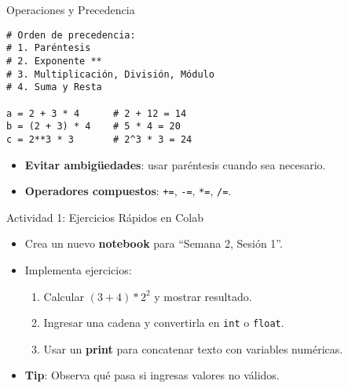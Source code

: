 \documentclass[10pt]{beamer}
\begin{document}
\begin{frame}[fragile]{Operaciones y Precedencia}
\begin{verbatim}
# Orden de precedencia:
# 1. Paréntesis
# 2. Exponente **
# 3. Multiplicación, División, Módulo
# 4. Suma y Resta

a = 2 + 3 * 4      # 2 + 12 = 14
b = (2 + 3) * 4    # 5 * 4 = 20
c = 2**3 * 3       # 2^3 * 3 = 24
\end{verbatim}
\begin{itemize}
  \item \textbf{Evitar ambigüedades}: usar paréntesis cuando sea necesario.
  \item \textbf{Operadores compuestos}: \texttt{+=}, \texttt{-=}, \texttt{*=}, \texttt{/=}.
\end{itemize}
\end{frame}

\begin{frame}{Actividad 1: Ejercicios Rápidos en Colab}
  \begin{itemize}
    \item Crea un nuevo \textbf{notebook} para “Semana 2, Sesión 1”.
    \item Implementa ejercicios:
      \begin{enumerate}
        \item Calcular \((3+4) * 2^2\) y mostrar resultado.
        \item Ingresar una cadena y convertirla en \texttt{int} o \texttt{float}.
        \item Usar un \textbf{print} para concatenar texto con variables numéricas.
      \end{enumerate}
    \item \textbf{Tip}: Observa qué pasa si ingresas valores no válidos.
  \end{itemize}
\end{frame}

\end{document}
